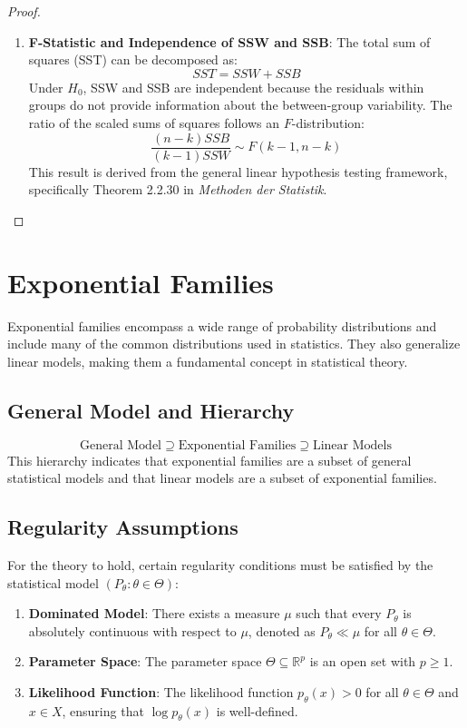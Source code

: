\documentclass[open=any, 11pt,paper=A4]{scrreprt}
\begin{document}
\begin{proof}
\begin{enumerate}
    \item \textbf{F-Statistic and Independence of SSW and SSB}: The total sum of squares (SST) can be decomposed as:
    \[
    SST = SSW + SSB
    \]
    Under $H_0$, SSW and SSB are independent because the residuals within groups do not provide information about the between-group variability. The ratio of the scaled sums of squares follows an $F$-distribution:
    \[
    \frac{(n - k)SSB}{(k - 1)SSW} \sim F(k - 1, n - k)
    \]
    This result is derived from the general linear hypothesis testing framework, specifically Theorem 2.2.30 in \textit{Methoden der Statistik}.
\end{enumerate}
\end{proof}

\section{Exponential Families}

Exponential families encompass a wide range of probability distributions and include many of the common distributions used in statistics. They also generalize linear models, making them a fundamental concept in statistical theory.

\subsection{General Model and Hierarchy}

\[
\text{General Model} \supseteq \text{Exponential Families} \supseteq \text{Linear Models}
\]
This hierarchy indicates that exponential families are a subset of general statistical models and that linear models are a subset of exponential families.

\subsection{Regularity Assumptions}

For the theory to hold, certain regularity conditions must be satisfied by the statistical model $(P_\theta : \theta \in \Theta)$:

\begin{enumerate}
    \item \textbf{Dominated Model}: There exists a measure $\mu$ such that every $P_\theta$ is absolutely continuous with respect to $\mu$, denoted as $P_\theta \ll \mu$ for all $\theta \in \Theta$.
    
    \item \textbf{Parameter Space}: The parameter space $\Theta \subseteq \mathbb{R}^p$ is an open set with $p \geq 1$.
    
    \item \textbf{Likelihood Function}: The likelihood function $p_\theta(x) > 0$ for all $\theta \in \Theta$ and $x \in X$, ensuring that $\log p_\theta(x)$ is well-defined.
\end{enumerate}
\end{document}

